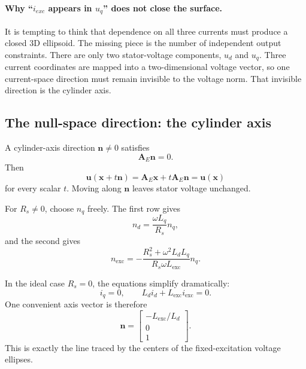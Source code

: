 \documentclass[11pt,a4paper]{article}
\newcommand{\id}{i_d}
\newcommand{\iq}{i_q}
\newcommand{\ie}{i_{\mathrm{exc}}}
\newcommand{\Rs}{R_s}
\newcommand{\Ld}{L_d}
\newcommand{\Lq}{L_q}
\newcommand{\Lexc}{L_{\mathrm{exc}}}
\newcommand{\w}{\omega}
\newcommand{\vct}[1]{\bm{#1}}
\newcommand{\mat}[1]{\bm{#1}}
\begin{document}
\paragraph{Why ``$i_{exc}$ appears in $u_q$'' does not close the surface.}
It is tempting to think that dependence on all three currents must produce a closed 3D ellipsoid. The missing piece is the number of independent output constraints. There are only two stator-voltage components, $u_d$ and $u_q$. Three current coordinates are mapped into a two-dimensional voltage vector, so one current-space direction must remain invisible to the voltage norm. That invisible direction is the cylinder axis.

\subsection{The null-space direction: the cylinder axis}

A cylinder-axis direction $\vct n\neq0$ satisfies
\begin{equation}
  \mat A_E\vct n=0.
  \label{eq:nullspace-axis}
\end{equation}
Then
\begin{equation}
  \vct u(\vct x+t\vct n)
  =\mat A_E\vct x+t\mat A_E\vct n
  =\vct u(\vct x)
\end{equation}
for every scalar $t$. Moving along $\vct n$ leaves stator voltage unchanged.

For $\Rs\neq0$, choose $n_q$ freely. The first row gives
\begin{equation}
  n_d=\frac{\w\Lq}{\Rs}n_q,
\end{equation}
and the second gives
\begin{equation}
  n_{\mathrm{exc}}
  =-\frac{\Rs^2+\w^2\Ld\Lq}{\Rs\w\Lexc}n_q.
  \label{eq:eesm-null-vector}
\end{equation}

In the ideal case $\Rs=0$, the equations simplify dramatically:
\begin{equation}
  \iq=0,
  \qquad
  \Ld\id+\Lexc\ie=0.
\end{equation}
One convenient axis vector is therefore
\begin{equation}
  \boxed{
  \vct n=
  \begin{bmatrix}
  -\Lexc/\Ld\\0\\1
  \end{bmatrix}.
  }
  \label{eq:ideal-eesm-null}
\end{equation}
This is exactly the line traced by the centers of the fixed-excitation voltage ellipses.
\end{document}
